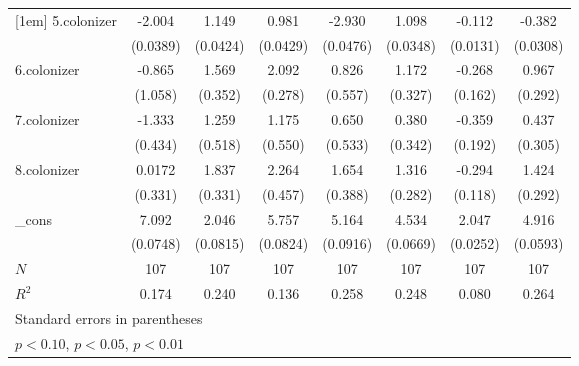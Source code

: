 {\begin{tabular}{l*{7}{c}}
[1em]
5.colonizer &      -2.004\sym{***}&       1.149\sym{***}&       0.981\sym{***}&      -2.930\sym{***}&       1.098\sym{***}&      -0.112\sym{***}&      -0.382\sym{***}\\
            &    (0.0389)         &    (0.0424)         &    (0.0429)         &    (0.0476)         &    (0.0348)         &    (0.0131)         &    (0.0308)         \\
[1em]
6.colonizer &      -0.865         &       1.569\sym{***}&       2.092\sym{***}&       0.826         &       1.172\sym{***}&      -0.268         &       0.967\sym{***}\\
            &     (1.058)         &     (0.352)         &     (0.278)         &     (0.557)         &     (0.327)         &     (0.162)         &     (0.292)         \\
[1em]
7.colonizer &      -1.333\sym{***}&       1.259\sym{**} &       1.175\sym{**} &       0.650         &       0.380         &      -0.359\sym{*}  &       0.437         \\
            &     (0.434)         &     (0.518)         &     (0.550)         &     (0.533)         &     (0.342)         &     (0.192)         &     (0.305)         \\
[1em]
8.colonizer &      0.0172         &       1.837\sym{***}&       2.264\sym{***}&       1.654\sym{***}&       1.316\sym{***}&      -0.294\sym{**} &       1.424\sym{***}\\
            &     (0.331)         &     (0.331)         &     (0.457)         &     (0.388)         &     (0.282)         &     (0.118)         &     (0.292)         \\
[1em]
\_cons      &       7.092\sym{***}&       2.046\sym{***}&       5.757\sym{***}&       5.164\sym{***}&       4.534\sym{***}&       2.047\sym{***}&       4.916\sym{***}\\
            &    (0.0748)         &    (0.0815)         &    (0.0824)         &    (0.0916)         &    (0.0669)         &    (0.0252)         &    (0.0593)         \\
\hline
\(N\)       &         107         &         107         &         107         &         107         &         107         &         107         &         107         \\
\(R^{2}\)   &       0.174         &       0.240         &       0.136         &       0.258         &       0.248         &       0.080         &       0.264         \\
\hline\hline
\multicolumn{8}{l}{\footnotesize Standard errors in parentheses}\\
\multicolumn{8}{l}{\footnotesize \sym{*} \(p<0.10\), \sym{**} \(p<0.05\), \sym{***} \(p<0.01\)}\\
\end{tabular}
}
